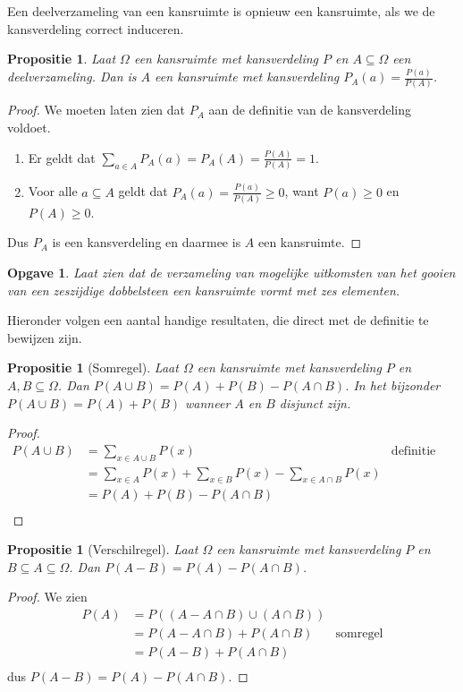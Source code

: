 \documentclass[a4paper]{book}
\newtheorem{proposition}[theorem]{Propositie}
\newtheorem{exercise}[theorem]{Opgave}
\theoremstyle{definition}
\begin{document}
Een deelverzameling van een kansruimte is opnieuw een kansruimte, als we de kansverdeling correct induceren.
\begin{proposition}
    Laat $\Omega$ een kansruimte met kansverdeling $P$ en $A \subseteq \Omega$ een deelverzameling.
    Dan is $A$ een kansruimte met kansverdeling $P_A(a) = \frac{P(a)}{P(A)}$.
\end{proposition}
\begin{proof}
    We moeten laten zien dat $P_A$ aan de definitie van de kansverdeling voldoet.
    \begin{enumerate}[i]
        \item Er geldt dat $\sum_{a \in A}P_A(a) = P_A(A) = \frac{P(A)}{P(A)} = 1$.
        \item Voor alle $a \subseteq A$ geldt dat $P_A(a) = \frac{P(a)}{P(A)} \geq 0$, want $P(a) \geq 0$ en $P(A) \geq 0$.
    \end{enumerate}
    Dus $P_A$ is een kansverdeling en daarmee is $A$ een kansruimte.
\end{proof}

\begin{exercise}
    Laat zien dat de verzameling van mogelijke uitkomsten van het gooien van een zeszijdige dobbelsteen een kansruimte vormt met zes elementen.
\end{exercise}

Hieronder volgen een aantal handige resultaten, die direct met de definitie te bewijzen zijn.
\begin{proposition}[Somregel]\label{somregel}
    Laat $\Omega$ een kansruimte met kansverdeling $P$ en $A,B \subseteq \Omega$.
    Dan $P(A \cup B) = P(A) + P(B) - P(A \cap B)$.
    In het bijzonder $P(A \cup B) = P(A) + P(B)$ wanneer $A$ en $B$ disjunct zijn.
\end{proposition}
\begin{proof}
    \begin{align*}
        P(A \cup B)     &= \sum_{x \in A \cup B} P(x) & \text{definitie kansverdeling}\\
                        &= \sum_{x \in A} P(x) + \sum_{x \in B} P(x) - \sum_{x \in A \cap B} P(x) \\
                        &= P(A) + P(B) - P(A \cap B) \\
    \end{align*}
\end{proof}

\begin{proposition}[Verschilregel]\label{verschilregel}
    Laat $\Omega$ een kansruimte met kansverdeling $P$ en $B \subseteq A \subseteq \Omega$.
    Dan $P(A - B) = P(A) - P(A \cap B) $.
\end{proposition}
\begin{proof}
    We zien
    \begin{align*}
        P(A)    &= P( (A - A \cap B) \cup (A \cap B) ) \\
                &= P(A - A \cap B ) + P(A \cap B) & \text{somregel} \\
                &= P(A - B) + P(A \cap B) \\
    \end{align*}
    dus $P(A - B) = P(A) - P(A \cap B) $.
\end{proof}
\end{document}
